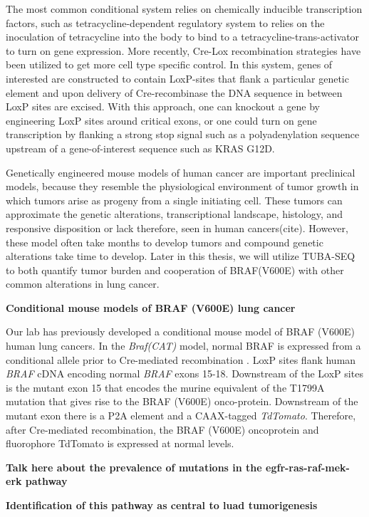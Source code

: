 The most common conditional system relies on chemically inducible transcription factors, such as tetracycline-dependent regulatory system to relies on the inoculation of tetracycline into the body to bind to a tetracycline-trans-activator to turn on gene expression. More recently, Cre-Lox recombination strategies have been utilized to get more cell type specific control. In this system, genes of interested are constructed to contain LoxP-sites that flank a particular genetic element and upon delivery of Cre-recombinase the DNA sequence in between LoxP sites are excised. With this approach, one can knockout a gene by engineering LoxP sites around critical exons, or one could turn on gene transcription by flanking a strong stop signal such as a polyadenylation sequence upstream of a gene-of-interest sequence such as KRAS G12D.

Genetically engineered mouse models of human cancer are important preclinical models, because they resemble the physiological environment of tumor growth in which tumors arise as progeny from a single initiating cell. These tumors can approximate the genetic alterations, transcriptional landscape, histology, and responsive disposition or lack therefore, seen in human cancers(cite). However, these model often take months to develop tumors and compound genetic alterations take time to develop. Later in this thesis, we will utilize TUBA-SEQ to both quantify tumor burden and cooperation of BRAF(V600E) with other common alterations in lung cancer.

\textbf{Conditional mouse models of BRAF (V600E) lung cancer}

Our lab has previously developed a conditional mouse model of BRAF (V600E) human lung cancers. In the \emph{Braf(CAT)} model, normal BRAF is expressed from a conditional allele prior to Cre-mediated recombination . LoxP sites flank human \emph{BRAF} cDNA encoding normal \emph{BRAF} exons 15-18. Downstream of the LoxP sites is the mutant exon 15 that encodes the murine equivalent of the T1799A mutation that gives rise to the BRAF (V600E) onco-protein. Downstream of the mutant exon there is a P2A element and a CAAX-tagged \emph{TdTomato}. Therefore, after Cre-mediated recombination, the BRAF (V600E) oncoprotein and fluorophore TdTomato is expressed at normal levels.

\textbf{Talk here about the prevalence of mutations in the egfr-ras-raf-mek-erk pathway}

\textbf{Identification of this pathway as central to luad tumorigenesis}

